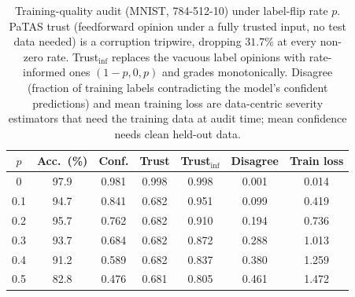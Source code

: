 \begin{table}[ht]
\centering\footnotesize
\setlength{\tabcolsep}{5pt}
\begin{tabular}{ccccccc}
\toprule
$p$ & Acc.\ (\%) & Conf. & Trust & Trust$_{\mathrm{inf}}$ & Disagree & Train loss \\
\midrule
0   & 97.9 & 0.981 & 0.998 & 0.998 & 0.001 & 0.014 \\
0.1 & 94.7 & 0.841 & 0.682 & 0.951 & 0.099 & 0.419 \\
0.2 & 95.7 & 0.762 & 0.682 & 0.910 & 0.194 & 0.736 \\
0.3 & 93.7 & 0.684 & 0.682 & 0.872 & 0.288 & 1.013 \\
0.4 & 91.2 & 0.589 & 0.682 & 0.837 & 0.380 & 1.259 \\
0.5 & 82.8 & 0.476 & 0.681 & 0.805 & 0.461 & 1.472 \\
\bottomrule
\end{tabular}
\caption{Training-quality audit (MNIST, 784-512-10) under label-flip rate $p$. PaTAS trust (feedforward opinion under a fully trusted input, no test data needed) is a corruption tripwire, dropping $31.7\%$ at every non-zero rate. Trust$_{\mathrm{inf}}$ replaces the vacuous label opinions with rate-informed ones $(1{-}p, 0, p)$ and grades monotonically. Disagree (fraction of training labels contradicting the model's confident predictions) and mean training loss are data-centric severity estimators that need the training data at audit time; mean confidence needs clean held-out data.}
\label{tab:audit}
\end{table}

